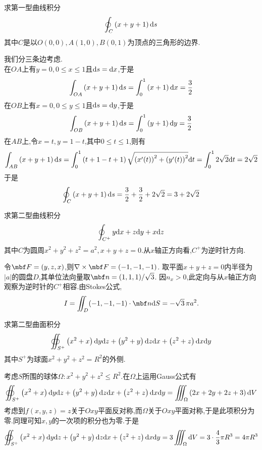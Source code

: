 \documentclass{ctexart}
\begin{document}
\begin{problem}[3.(12\songti{分})]
    求第一型曲线积分
    \[\oint_C\left(x+y+1\right)\mathrm{d} s\]
    其中$C$是以$O(0,0),A(1,0),B(0,1)$为顶点的三角形的边界.

\end{problem}
\begin{solution}
    我们分三条边考虑.\\
    在$OA$上有$y=0,0\leqslant x\leqslant 1$且$\mathrm{d} s=\mathrm{d} x$,于是
    \[\int_{OA}\left(x+y+1\right)\mathrm{d} s=\int_0^1\left(x+1\right)\mathrm{d} x=\dfrac32\]
    在$OB$上有$x=0,0\leqslant y\leqslant 1$且$\mathrm{d} s=\mathrm{d} y$,于是
    \[\int_{OB}\left(x+y+1\right)\mathrm{d} s=\int_0^1\left(y+1\right)\mathrm{d} y=\dfrac32\]
    在$AB$上,令$x=t,y=1-t$,其中$0\leqslant t\leqslant 1$,则有
    \[\int_{AB}\left(x+y+1\right)\mathrm{d} s=\int_0^1\left(t+1-t+1\right)\sqrt{\left(x'(t)\right)^2+\left(y'(t)\right)^2}\mathrm{d} t=\int_0^12\sqrt2\mathrm{d} t=2\sqrt2\]
    于是
    \[\oint_C\left(x+y+1\right)\mathrm{d} s=\dfrac32+\dfrac32+2\sqrt2=3+2\sqrt2\]

\end{solution}
\begin{problem}[4.(14\songti{分})]
    求第二型曲线积分
    \[\oint_{C^+}y\mathrm{d} x+z\mathrm{d} y+x\mathrm{d} z\]
    其中$C$为圆周$x^2+y^2+z^2=a^2,x+y+z=0$.从$x$轴正方向看,$C^+$为逆时针方向.
        
\end{problem}
\begin{solution}
令$\mbf F=(y,z,x)$,则$\nabla\times\mbf F=(-1,-1,-1)$.
    取平面$x+y+z=0$内半径为$|a|$的圆盘$D$,其单位法向量取$\mbf n=(1,1,1)/\sqrt3$.
    因$n_x>0$,此定向与从$x$轴正方向观察为逆时针的$C^+$相容.由Stokes公式,
    \[I=\iint_D(-1,-1,-1)\cdot\mbf n\di S=-\sqrt3\,\pi a^2.\]
\end{solution}
\begin{problem}[5.(14\songti{分})]
    求第二型曲面积分
    \[\oiint_{S^+}\left(x^2+x\right)\mathrm{d} y\mathrm{d} z+\left(y^2+y\right)\mathrm{d} z\mathrm{d} x+\left(z^2+z\right)\mathrm{d} x\mathrm{d} y\]
    其中$S^+$为球面$x^2+y^2+z^2=R^2$的外侧.
\end{problem}
\begin{solution}
    考虑$S$所围的球体$\Omega:x^2+y^2+z^2\leqslant R^2$.在$\Omega$上运用Gauss公式有
    \[\oiint_{S^+}\left(x^2+x\right)\mathrm{d} y\mathrm{d} z+\left(y^2+y\right)\mathrm{d} z\mathrm{d} x+\left(z^2+z\right)\mathrm{d} x\mathrm{d} y=\iiint_{\Omega}\left(2x+2y+2z+3\right)\mathrm{d} V\]
    考虑到$f(x,y,z)=z$关于$Oxy$平面反对称,而$\Omega$关于$Oxy$平面对称,于是此项积分为零.同理可知$x,y$的一次项的积分也为零.于是
    \[\oiint_{S^+}\left(x^2+x\right)\mathrm{d} y\mathrm{d} z+\left(y^2+y\right)\mathrm{d} z\mathrm{d} x+\left(z^2+z\right)\mathrm{d} x\mathrm{d} y=3\iiint_{\Omega}\mathrm{d} V=3\cdot\dfrac43\pi R^3=4\pi R^3\]

\end{solution}
\end{document}
